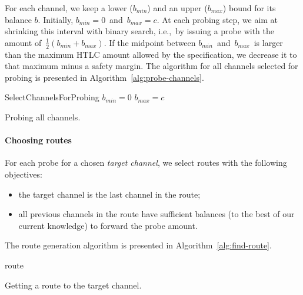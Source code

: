 For each channel, we keep a lower ($b_{min}$) and an upper ($b_{max}$) bound for its balance $b$.
Initially, $b_{min}=0$~and~$b_{max}=c$.
At each probing step, we aim at shrinking this interval with binary search, i.e.,~by issuing a probe with the amount of~$\frac{1}{2} (b_{min} + b_{max})$.
If the midpoint between $b_{min}$~and~$b_{max}$~is larger than the maximum HTLC amount allowed by the specification, we decrease it to that maximum minus a safety margin.
The algorithm for all channels selected for probing is presented in Algorithm~\ref{alg:probe-channels}.

\begin{algorithm}
	SelectChannelsForProbing\;
	 {	
		$b_{min} = 0$\;
		$b_{max} = c$\;
		 {
		}
	}
	\caption{Probing all channels.}
	\label{alg:probe-channels}
\end{algorithm}


\paragraph{Choosing routes}

For each probe for a chosen \textit{target channel}, we select routes with the following objectives:
\begin{itemize}
	\item the target channel is the last channel in the route;
	\item all previous channels in the route have sufficient balances (to the best of our current knowledge) to forward the probe amount.
\end{itemize}

The route generation algorithm is presented in Algorithm~\ref{alg:find-route}.

\begin{algorithm}
	 {
	}
	\Return route\;
	\caption{Getting a route to the target channel.}
	\label{alg:find-route}
\end{algorithm}

